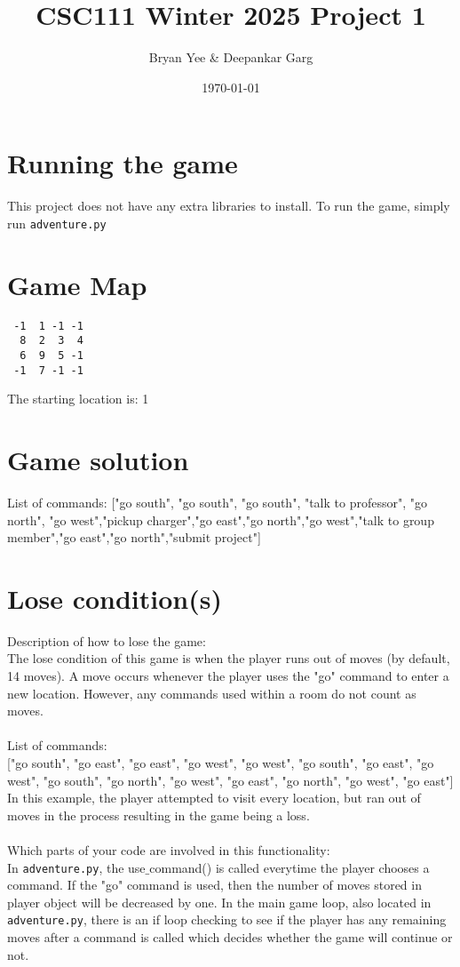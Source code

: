 \documentclass[11pt]{article}
\title{CSC111 Winter 2025 Project 1}
\author{Bryan Yee & Deepankar Garg}
\date{\today}
\begin{document}
\maketitle

\section*{Running the game}
This project does not have any extra libraries to install. To run the game, simply run \texttt{adventure.py}

\section*{Game Map}
\begin{verbatim}
 -1  1 -1 -1 
  8  2  3  4
  6  9  5 -1
 -1  7 -1 -1
\end{verbatim}
The starting location is: 1

\section*{Game solution}
List of commands: ["go south", "go south", "go south", "talk to professor", "go north", "go west","pickup charger","go east","go north","go west","talk to group member","go east","go north","submit project"]

\section*{Lose condition(s)}
Description of how to lose the game:\\
The lose condition of this game is when the player runs out of moves (by default, 14 moves). A move occurs whenever the player uses the "go" command to enter a new location. However, any commands used within a room do not count as moves.
\\\\
List of commands:\\
{["go south", "go east", "go east", "go west", "go west", "go south", "go east", "go west", "go south", "go north", "go west", "go east", "go north", "go west", "go east"]}\\
In this example, the player attempted to visit every location, but ran out of moves in the process resulting in the game being a loss.
\\\\
Which parts of your code are involved in this functionality:\\
In \texttt{adventure.py}, the use$\_$command() is called everytime the player chooses a command. If the "go" command is used, then the number of moves stored in player object will be decreased by one. In the main game loop, also located in \texttt{adventure.py}, there is an if loop checking to see if the player has any remaining moves after a command is called which decides whether the game will continue or not.
\end{document}
